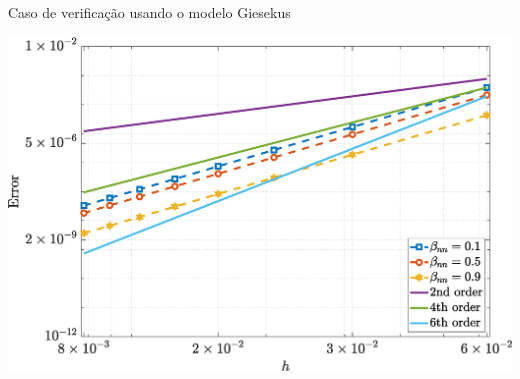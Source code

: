 \begin{frame}{Caso de verificação usando o modelo Giesekus}
\begin{minipage}{0.325\textwidth}
        \label{giesekus_txy_Case11}
    \end{minipage}
    \hfill
    \begin{minipage}{0.325\textwidth}
        \centering
        \includegraphics[width=\textwidth]{Figures/NormErr_2nd_Re_100_Wi_1_epsilon_0_xi_0_alphaG_0.1_Dt_1e-06_at_0.05_tipsim_1_MMS_12_Tyy.eps}
        \label{giesekus_tyy_Case11}
    \end{minipage}
\end{frame}

